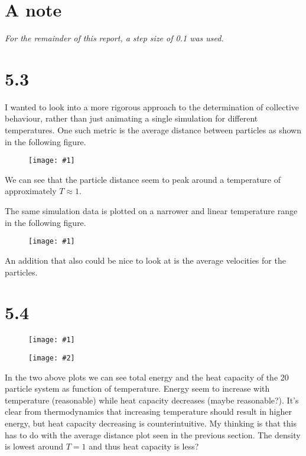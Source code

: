 \documentclass[11pt]{article}
\newcommand{\doublefigure}[2]{
\begin{figure}[H]
  \centering
  \begin{minipage}{0.45\textwidth}
    \centering
    \texttt{[image: \#1]}
  \end{minipage}
  \begin{minipage}{0.45\textwidth}
    \centering
    \texttt{[image: \#2]}
  \end{minipage}
\end{figure}
}
\newcommand{\singlewiderfigure}[1]{
\begin{figure}[H]
  \centering
  \begin{minipage}{0.6\textwidth}
    \centering
    \texttt{[image: \#1]}
  \end{minipage}
\end{figure}
}
\begin{document}
\section*{A note}
\textit{For the remainder of this report, a step size of 0.1 was used.}

\section*{5.3}
I wanted to look into a more rigorous approach to the determination of collective behaviour, rather than just animating a single simulation for different temperatures.
One such metric is the average distance between particles as shown in the following figure.
\singlewiderfigure{./plots/5_3/acceptance.png}
We can see that the particle distance seem to peak around a temperature of approximately $T\approx 1$. 

The same simulation data is plotted on a narrower and linear temperature range in the following figure.
\singlewiderfigure{./plots/5_3/small_range.png}

An addition that also could be nice to look at is the average velocities for the particles.

\section*{5.4}
\doublefigure{./plots/5_4/energy.png}{./plots/5_4/heat.png}
In the two above plots we can see total energy and the heat capacity of the 20 particle system as function of temperature.
Energy seem to increase with temperature (reasonable) while heat capacity decreases (maybe reasonable?).
It's clear from thermodynamics that increasing temperature should result in higher energy, but heat capacity decreasing is counterintuitive.
My thinking is that this has to do with the average distance plot seen in the previous section. The density is lowest around $T=1$ and thus heat capacity is less?
\end{document}
